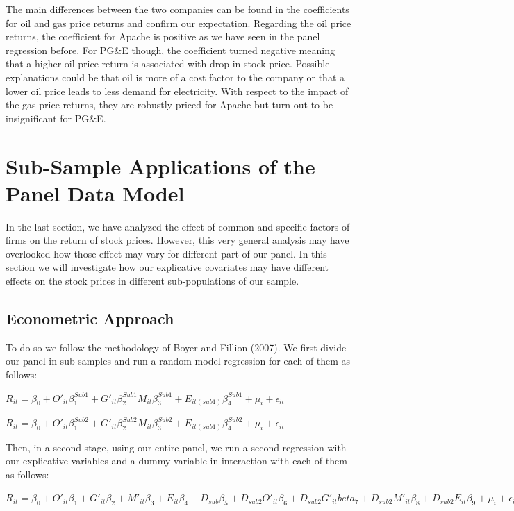 \documentclass[a4paper]{article}
\begin{document}
The main differences between the two companies can be found in the coefficients for oil and gas price returns and confirm our expectation. Regarding the oil price returns, the coefficient for Apache is positive as we have seen in the panel regression before. For PG\&E though, the coefficient turned negative meaning that a higher oil price return is associated with drop in stock price. Possible explanations could be that oil is more of a cost factor to the company or that a lower oil price leads to less demand for electricity. With respect to the impact of the gas price returns, they are robustly priced for Apache but turn out to be insignificant for PG\&E. 

\section{Sub-Sample Applications of the Panel Data Model}

In the last section, we have analyzed the effect of common and specific factors of firms on the return of stock prices. However, this very general analysis may have overlooked how those effect may vary for different part of our panel. In this section we will investigate how our explicative covariates may have different effects on the stock prices in different sub-populations of our sample. 

\subsection{Econometric Approach}

To do so we follow the methodology of Boyer and Fillion (2007). We first divide our panel in sub-samples and run a random model regression for each of them as follows: 

$R_{it} = \beta_{0} + O'_{it} \beta_1^{Sub1} + G'_{it} \beta_2^{Sub1} M_{it} \beta_3^{Sub1} + E_{it(sub1)} \beta_4^{Sub1} + \mu_i + \epsilon_{it}$

$R_{it} = \beta_{0} + O'_{it} \beta_1^{Sub2} + G'_{it} \beta_2^{Sub2} M_{it} \beta_3^{Sub2} + E_{it(sub1)} \beta_4^{Sub2} + \mu_i + \epsilon_{it}$

Then, in a second stage, using our entire panel, we run a second regression with our explicative variables and a dummy variable in interaction with each of them as follows: 

$R_{it} = \beta_{0} + O'_{it} \beta_1 + G'_{it} \beta_2 + M'_{it} \beta_3 + E_{it} \beta_4 +D_{sub}\beta_5 + D_{sub2} O'_{it} \beta_6 + D_{sub2} G'_{it} beta_7 + D_{sub2} M'_{it} \beta_8 + D_{sub2} E_{it} \beta_9 + \mu_i + \epsilon_{it}$
\end{document}
